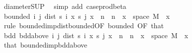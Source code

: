 \begin{isabellebody}
\ diameter{\isacharunderscore}{\kern0pt}SUP\ \isamarkupfalse%
\ {\isacharparenleft}{\kern0pt}simp\ add{\isacharcolon}{\kern0pt}\ case{\isacharunderscore}{\kern0pt}prod{\isacharunderscore}{\kern0pt}beta{\isacharprime}{\kern0pt}{\isacharparenright}{\kern0pt}\isanewline
\ \ \isanewline
\ \ \isamarkupfalse%
\ {\isachardoublequoteopen}bounded\ {\isacharparenleft}{\kern0pt}{\isacharparenleft}{\kern0pt}{\isasymlambda}{\isacharparenleft}{\kern0pt}i{\isacharcomma}{\kern0pt}\ j{\isacharparenright}{\kern0pt}{\isachardot}{\kern0pt}\ dist\ {\isacharparenleft}{\kern0pt}s\ i\ x{\isacharparenright}{\kern0pt}\ {\isacharparenleft}{\kern0pt}s\ j\ x{\isacharparenright}{\kern0pt}{\isacharparenright}{\kern0pt}\ {\isacharbackquote}{\kern0pt}\ {\isacharparenleft}{\kern0pt}{\isacharbraceleft}{\kern0pt}n{\isachardot}{\kern0pt}{\isachardot}{\kern0pt}{\isacharbraceright}{\kern0pt}\ {\isasymtimes}\ {\isacharbraceleft}{\kern0pt}n{\isachardot}{\kern0pt}{\isachardot}{\kern0pt}{\isacharbraceright}{\kern0pt}{\isacharparenright}{\kern0pt}{\isacharparenright}{\kern0pt}{\isachardoublequoteclose}\ \ {\isachardoublequoteopen}x\ {\isasymin}\ space\ M{\isachardoublequoteclose}\ \ x\ \isamarkupfalse%
\ {\isacharparenleft}{\kern0pt}rule\ bounded{\isacharunderscore}{\kern0pt}imp{\isacharunderscore}{\kern0pt}dist{\isacharunderscore}{\kern0pt}bounded{\isacharbrackleft}{\kern0pt}OF\ bounded{\isacharcomma}{\kern0pt}\ OF\ that{\isacharbrackright}{\kern0pt}{\isacharparenright}{\kern0pt}\isanewline
\ \ \isamarkupfalse%
\ bdd{\isacharcolon}{\kern0pt}\ {\isachardoublequoteopen}bdd{\isacharunderscore}{\kern0pt}above\ {\isacharparenleft}{\kern0pt}{\isacharparenleft}{\kern0pt}{\isasymlambda}{\isacharparenleft}{\kern0pt}i{\isacharcomma}{\kern0pt}\ j{\isacharparenright}{\kern0pt}{\isachardot}{\kern0pt}\ dist\ {\isacharparenleft}{\kern0pt}s\ i\ x{\isacharparenright}{\kern0pt}\ {\isacharparenleft}{\kern0pt}s\ j\ x{\isacharparenright}{\kern0pt}{\isacharparenright}{\kern0pt}\ {\isacharbackquote}{\kern0pt}\ {\isacharparenleft}{\kern0pt}{\isacharbraceleft}{\kern0pt}n{\isachardot}{\kern0pt}{\isachardot}{\kern0pt}{\isacharbraceright}{\kern0pt}\ {\isasymtimes}\ {\isacharbraceleft}{\kern0pt}n{\isachardot}{\kern0pt}{\isachardot}{\kern0pt}{\isacharbraceright}{\kern0pt}{\isacharparenright}{\kern0pt}{\isacharparenright}{\kern0pt}{\isachardoublequoteclose}\ \ {\isachardoublequoteopen}x\ {\isasymin}\ space\ M{\isachardoublequoteclose}\ \ x\ \isamarkupfalse%
\ that\ bounded{\isacharunderscore}{\kern0pt}imp{\isacharunderscore}{\kern0pt}bdd{\isacharunderscore}{\kern0pt}above\ \isamarkupfalse%

\end{isabellebody}
